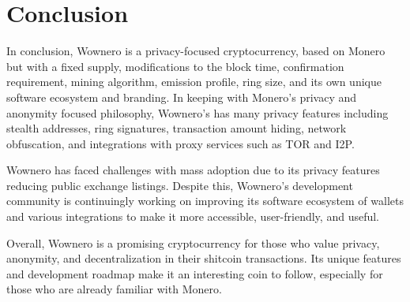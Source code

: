 \pagebreak
\section{Conclusion}
In conclusion, Wownero is a privacy-focused cryptocurrency, based on Monero but with a fixed supply, modifications to the block time, confirmation requirement, mining algorithm, emission profile, ring size, and its own unique software ecosystem and branding. In keeping with Monero's privacy and anonymity focused philosophy, Wownero's has many privacy features including stealth addresses, ring signatures, transaction amount hiding, network obfuscation, and integrations with proxy services such as TOR and I2P.

Wownero has faced challenges with mass adoption due to its privacy features reducing public exchange listings. Despite this, Wownero's development community is continuingly working on improving its software ecosystem of wallets and various integrations to make it more accessible, user-friendly, and useful.

Overall, Wownero is a promising cryptocurrency for those who value privacy, anonymity, and decentralization in their shitcoin transactions. Its unique features and development roadmap make it an interesting coin to follow, especially for those who are already familiar with Monero.